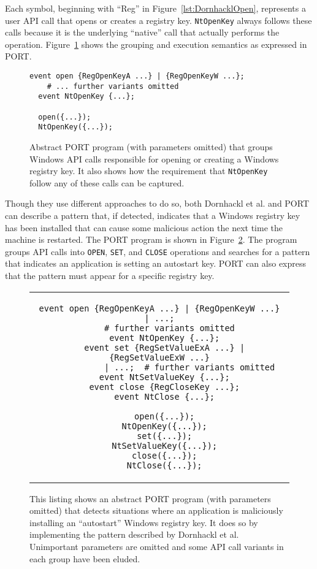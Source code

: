 Each symbol, beginning with ``Reg'' in Figure~\ref{lst:DornhacklOpen}, represents a user
API call that opens or creates a registry key.  {\tt NtOpenKey} always follows
these calls because it is the underlying ``native'' call that actually performs the operation.
Figure~\ref{lst:PORTOpenReg} shows the grouping and execution semantics as expressed
in PORT.

\begin{figure}
\begin{lstlisting}[gobble=2]
  event open {RegOpenKeyA ...} | {RegOpenKeyW ...};
    # ... further variants omitted
  event NtOpenKey {...};

  open({...});
  NtOpenKey({...});
\end{lstlisting}
  \caption{Abstract PORT program (with parameters
  omitted) that groups Windows API calls responsible for opening or
  creating a Windows registry key.  It also shows
  how the requirement that \lstinline+NtOpenKey+ follow any of these calls can be
  captured.}
\label{lst:PORTOpenReg}
\end{figure}

Though they use different approaches to do so,  both Dornhackl et al. and PORT can describe a pattern that, if
detected, indicates that
a Windows registry key has been installed
that can cause some malicious action
the next time the machine is restarted.
The PORT program is shown in Figure~\ref{lst:PORTRegDetect}.  The program groups API calls into \lstinline+OPEN+, \lstinline+SET+, and \lstinline+CLOSE+ operations and searches for a pattern that
indicates
an application is
setting an autostart key.  PORT can also express
that the pattern must appear for a specific registry key.

\begin{figure}
\centering
\begin{tabular}{c}
\begin{lstlisting}[gobble=2]
  event open {RegOpenKeyA ...} | {RegOpenKeyW ...} | ...;
    # further variants omitted
  event NtOpenKey {...};
  event set {RegSetValueExA ...} | {RegSetValueExW ...}
            | ...;  # further variants omitted
  event NtSetValueKey {...};
  event close {RegCloseKey ...};
  event NtClose {...};

  open({...});
  NtOpenKey({...});
  set({...});
  NtSetValueKey({...});
  close({...});
  NtClose({...});
\end{lstlisting}
\end{tabular}
  \caption{This listing shows an abstract PORT program (with parameters
  omitted) that detects situations where an application is maliciously
  installing an ``autostart'' Windows registry key.  It does so by
  implementing the pattern described by Dornhackl et al.  Unimportant
  parameters are omitted and some API call variants in each group have been
  eluded.}
\label{lst:PORTRegDetect}
\end{figure}


